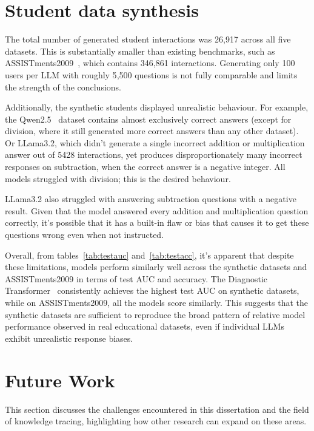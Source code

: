 \section{Student data synthesis}

The total number of generated student interactions was 26{,}917 across all five datasets. This is substantially smaller than existing benchmarks, such as ASSISTments2009~\autocite{assist2009}, which contains 346{,}861 interactions. Generating only 100 users per LLM with roughly 5{,}500 questions is not fully comparable and limits the strength of the conclusions.

Additionally, the synthetic students displayed unrealistic behaviour. For example, the Qwen2.5~\autocite{qwen2.5} dataset contains almost exclusively correct answers (except for division, where it still generated more correct answers than any other dataset). Or LLama3.2, which didn't generate a single incorrect addition or multiplication answer out of 5428 interactions, yet produces disproportionately many incorrect responses on subtraction, when the correct answer is a negative integer. All models struggled with division; this is the desired behaviour.

LLama3.2 also struggled with answering subtraction questions with a negative result. Given that the model answered every addition and multiplication question correctly, it's possible that it has a built-in flaw or bias that causes it to get these questions wrong even when not instructed.

Overall, from tables~\ref{tab:testauc} and~\ref{tab:testacc}, it's apparent that despite these limitations, models perform similarly well across the synthetic datasets and ASSISTments2009 in terms of test AUC and accuracy. The Diagnostic Transformer~\parencite{dtransformer} consistently achieves the highest test AUC on synthetic datasets, while on ASSISTments2009, all the models score similarly. This suggests that the synthetic datasets are sufficient to reproduce the broad pattern of relative model performance observed in real educational datasets, even if individual LLMs exhibit unrealistic response biases.

\section{Future Work}

This section discusses the challenges encountered in this dissertation and the field of knowledge tracing, highlighting how other research can expand on these areas.

